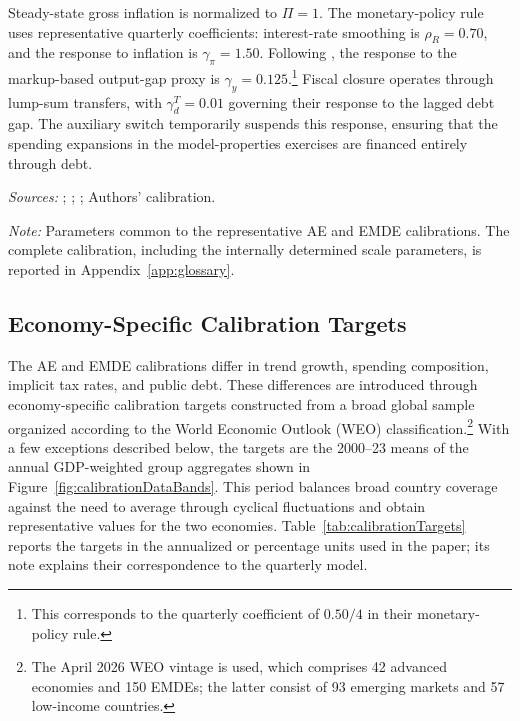 \documentclass[a4paper,11pt]{article}
\newcommand{\tabnote}[2]{\vspace{2mm}\par\noindent\begin{minipage}{0.9\textwidth}\footnotesize\setlength{\parindent}{0pt}\emph{Sources: }#1\par\vspace{2mm}\emph{Note: }#2\end{minipage}}
\begin{document}
Steady-state gross inflation is normalized to $\Pi=1$.
The monetary-policy rule uses representative quarterly coefficients: interest-rate smoothing is $\rho_R=0.70$, and the response to inflation is $\gamma_\pi=1.50$.
Following \citet{GertlerKaradi2011}, the response to the markup-based output-gap proxy is $\gamma_y=0.125$.\footnote{This corresponds to the quarterly coefficient of $0.50/4$ in their monetary-policy rule.}
Fiscal closure operates through lump-sum transfers, with $\gamma_d^T=0.01$ governing their response to the lagged debt gap.
The auxiliary switch temporarily suspends this response, ensuring that the spending expansions in the model-properties exercises are financed entirely through debt.

\begin{table}[H]
    \centering
    \caption{Common Macroeconomic and Policy Parameters \label{tab:commonParameters}}
    \footnotesize
    \renewcommand{\arraystretch}{1.2}
    

    \vspace{1mm}
    \tabnote{\citet{gali2015}; \citet{Andersonetal2013}; \citet{Anzoateguietal2019}; Authors' calibration.}{Parameters common to the representative AE and EMDE calibrations.
The complete calibration, including the internally determined scale parameters, is reported in Appendix~\ref{app:glossary}.}
\end{table}

\subsection{Economy-Specific Calibration Targets}

The AE and EMDE calibrations differ in trend growth, spending composition, implicit tax rates, and public debt.
These differences are introduced through economy-specific calibration targets constructed from a broad global sample organized according to the World Economic Outlook (WEO) classification.\footnote{The April 2026 WEO vintage is used, which comprises 42 advanced economies and 150 EMDEs; the latter consist of 93 emerging markets and 57 low-income countries.}
With a few exceptions described below, the targets are the 2000--23 means of the annual GDP-weighted group aggregates shown in Figure~\ref{fig:calibrationDataBands}.
This period balances broad country coverage against the need to average through cyclical fluctuations and obtain representative values for the two economies.
Table~\ref{tab:calibrationTargets} reports the targets in the annualized or percentage units used in the paper; its note explains their correspondence to the quarterly model.
\end{document}
